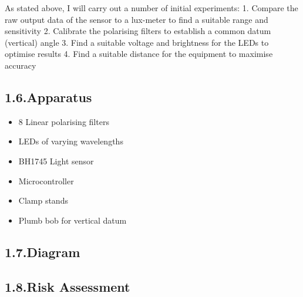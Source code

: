 \documentclass{article}
\begin{document}
\noindent{}As stated above, I will carry out a number of initial experiments:
1. Compare the raw output data of the sensor to a lux-meter to find a suitable range and sensitivity
2. Calibrate the polarising filters to establish a common datum (vertical) angle
3. Find a suitable voltage and brightness for the LEDs to optimise results
4. Find a suitable distance for the equipment to maximise accuracy%

\subsection{1.6.\hspace*{0.5em}Apparatus}\label{sec-apparatus}%

\begin{itemize}[noitemsep,topsep=\mdcompacttopsep]%

\item{}8 Linear polarising filters%

\item{}LEDs of varying wavelengths%

\item{}BH1745 Light sensor%

\item{}Microcontroller%

\item{}Clamp stands%

\item{}Plumb bob for vertical datum%
\end{itemize}%

\subsection{1.7.\hspace*{0.5em}Diagram}\label{sec-diagram}%

\subsection{1.8.\hspace*{0.5em}Risk Assessment}\label{sec-risk-assessment}%
\end{document}
